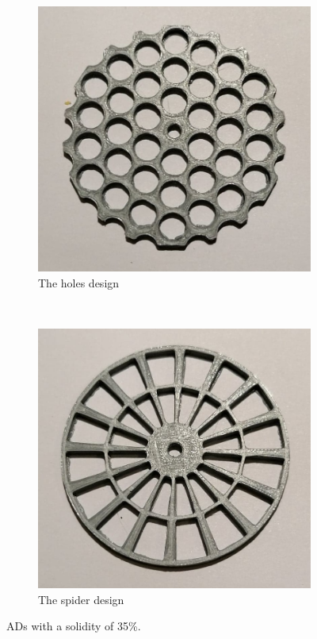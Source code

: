 \begin{figure} [h!]
    \centering
    \begin{subfigure}[b]{0.45\linewidth}
        \includegraphics[width=\textwidth]{0_Images/holes35.jpg}
        \caption{The \gls{holes} design}
        \label{Fig:holes35}
    \end{subfigure}
    ~
    \begin{subfigure}[b]{0.45\linewidth}
        \includegraphics[width=\textwidth]{0_Images/spider35.jpg}
        \caption{The \gls{spider} design}
        \label{Fig:spider35}
    \end{subfigure}
    \caption{\gls{AD}s with a solidity of 35\%.}
    \label{Fig:35Sol}
\end{figure}

